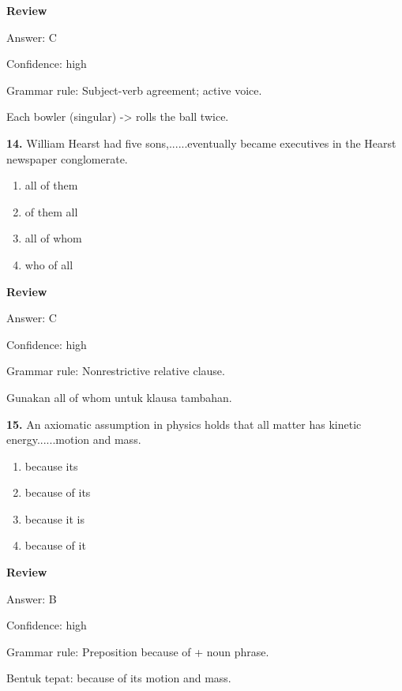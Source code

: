 \documentclass[12pt]{article}
\begin{document}
\par
\begingroup
\setlength{\parskip}{0pt}
\setlength{\parindent}{0pt}
\textbf{Review}\par
Answer: C\par
Confidence: high\par
Grammar rule: Subject-verb agreement; active voice.\par
Each bowler (singular) -> rolls the ball twice.\par
\endgroup
\par
\vspace{0.25\baselineskip}
\noindent\textbf{14.} William Hearst had five sons,......eventually became executives in the Hearst newspaper conglomerate.
\begin{enumerate}[label=(\Alph*),leftmargin=*,itemsep=0.2em]
\item all of them
\item of them all
\item all of whom
\item who of all
\end{enumerate}
\par
\begingroup
\setlength{\parskip}{0pt}
\setlength{\parindent}{0pt}
\textbf{Review}\par
Answer: C\par
Confidence: high\par
Grammar rule: Nonrestrictive relative clause.\par
Gunakan all of whom untuk klausa tambahan.\par
\endgroup
\par
\vspace{0.25\baselineskip}
\noindent\textbf{15.} An axiomatic assumption in physics holds that all matter has kinetic energy......motion and mass.
\begin{enumerate}[label=(\Alph*),leftmargin=*,itemsep=0.2em]
\item because its
\item because of its
\item because it is
\item because of it
\end{enumerate}
\par
\begingroup
\setlength{\parskip}{0pt}
\setlength{\parindent}{0pt}
\textbf{Review}\par
Answer: B\par
Confidence: high\par
Grammar rule: Preposition because of + noun phrase.\par
Bentuk tepat: because of its motion and mass.\par
\endgroup
\par
\vspace{0.25\baselineskip}
\end{document}
